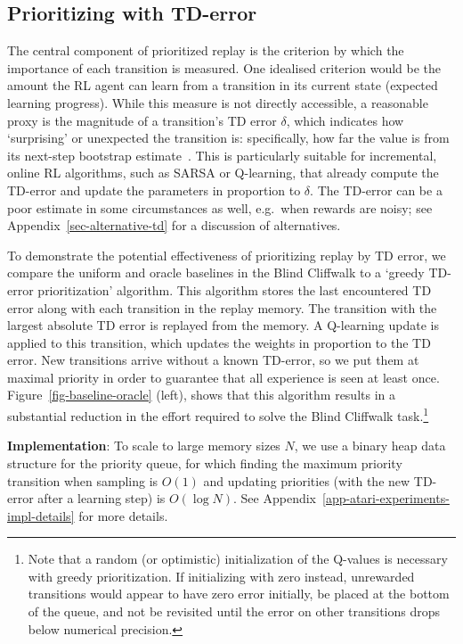 \documentclass[a4paper]{article}
\begin{document}
\subsection{Prioritizing with TD-error}
The central component of prioritized replay is the criterion by which the importance of each transition is measured. 
One idealised criterion would be the amount the RL agent
can learn from a transition in its current state (expected learning progress). 
While this measure is not directly accessible, a reasonable proxy is the magnitude of 
a transition's TD error $\delta$, which indicates how `surprising' or unexpected the transition is: specifically, how far the value is from its next-step bootstrap estimate~\citep{gen-sweeping}.
This is particularly suitable for incremental, online RL algorithms, such as SARSA or Q-learning, that already compute the TD-error and update
the parameters in proportion to $\delta$.
The TD-error can be a poor estimate in some circumstances as well, e.g.~when rewards are noisy; 
see Appendix~\ref{sec-alternative-td} for a discussion of alternatives.


To demonstrate the potential effectiveness of prioritizing replay by TD error, 
we compare the uniform and oracle baselines in the Blind Cliffwalk to 
a `greedy TD-error prioritization' algorithm. This algorithm stores the last encountered TD error along with each transition in the replay memory. The transition with the largest absolute TD error is replayed from the memory. A Q-learning update is applied to this transition, which updates the weights in proportion to the TD error. 
New transitions arrive without a known TD-error, so we put them at maximal priority in order to guarantee that
all experience is seen at least once. 
Figure~\ref{fig-baseline-oracle} (left), shows that this algorithm results in a substantial reduction in the effort required to solve the Blind Cliffwalk task.\footnote{
Note that a random (or optimistic) initialization of the Q-values is necessary with greedy prioritization.
If initializing with zero instead, unrewarded transitions would appear to have zero error initially, be placed at the bottom of the queue, and not be revisited until the error on other transitions drops below numerical precision.
}

{\bf Implementation}: To scale to large memory sizes $N$,
we use a binary heap data structure for the priority queue, for which 
finding the maximum priority transition when sampling is $O(1)$
and updating priorities (with the new TD-error after a learning step) is $O(\log N)$.
See Appendix~\ref{app-atari-experiments-impl-details} for more details.
\end{document}
